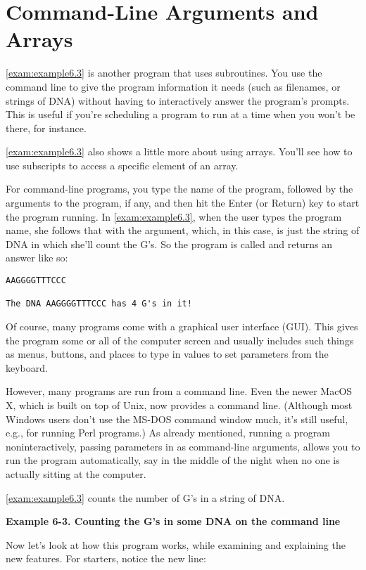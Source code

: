 \section{Command-Line Arguments and Arrays}
\autoref{exam:example6.3} is another program that uses subroutines. You use the command line to give the program information it needs (such as filenames, or strings of DNA) without having to interactively answer the program's prompts. This is useful if you're scheduling a program to run at a time when you won't be there, for instance.

\autoref{exam:example6.3} also shows a little more about using arrays. You'll see how to use subscripts to access a specific element of an array.

For command-line programs, you type the name of the program, followed by the arguments to the program, if any, and then hit the Enter (or Return) key to start the program running. In \autoref{exam:example6.3}, when the user types the program name, she follows that with the argument, which, in this case, is just the string of DNA in which she'll count the G's. So the program is called and returns an answer like so:

\begin{lstlisting}
AAGGGGTTTCCC

The DNA AAGGGGTTTCCC has 4 G's in it!
\end{lstlisting}

Of course, many programs come with a graphical user interface (GUI).  This gives the program some or all of the computer screen and usually includes such things as menus, buttons, and places to type in values to set parameters from the keyboard.

However, many programs are run from a command line. Even the newer MacOS X, which is built on top of Unix, now provides a command line. (Although most Windows users don't use the MS-DOS command window much, it's still useful, e.g., for running Perl programs.) As already mentioned, running a program noninteractively, passing parameters in as command-line arguments, allows you to run the program automatically, say in the middle of the night when no one is actually sitting at the computer.  

\autoref{exam:example6.3} counts the number of G's in a string of DNA. 

\textbf{Example 6-3. Counting the G's in some DNA on the command line}


Now let's look at how this program works, while examining and explaining the new features. For starters, notice the new line:


